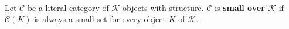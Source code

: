 Let $\mathcal{C}$ be a literal category of $\mathcal{K}$-objects with structure. $\mathcal{C}$ is \textbf{small over $\mathcal{K}$} if $\mathcal{C}(K)$ is always a small set for every object $K$ of $\mathcal{K}$.

